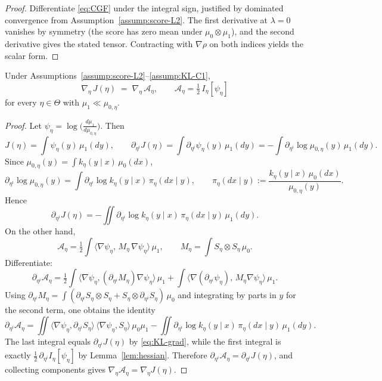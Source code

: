 \begin{proof}
Differentiate \eqref{eq:CGF} under the integral sign, justified by dominated convergence from Assumption~\ref{assump:score-L2}. The first derivative at $\lambda=0$ vanishes by symmetry (the score has zero mean under $\mu_0\otimes\mu_1$), and the second derivative gives the stated tensor. Contracting with $\nabla\rho$ on both indices yields the scalar form.
\end{proof}

\begin{theorem}
\label{thm:rose-equality}
Under Assumptions~\ref{assump:score-L2}--\ref{assump:KL-C1},
\[
    \boxed{
    \nabla_\eta\, J(\eta)
    \;=\;
    \nabla_\eta\, \mathcal A_\eta,
    \qquad
    \mathcal A_\eta = \tfrac12\, I_\eta[\psi_\eta]
    }
\]
for every $\eta\in\Theta$ with $\mu_1\ll\mu_{0,\eta}$.
\end{theorem}

\begin{proof}
Let $\psi_\eta=\log\big(\frac{d\mu_1}{d\mu_{0,\eta}}\big)$. Then
\[
    J(\eta)=\int \psi_\eta(y)\,\mu_1(dy),\qquad
    \partial_{\eta^i}J(\eta)=\int \partial_{\eta^i}\psi_\eta(y)\,\mu_1(dy)
    = -\int \partial_{\eta^i}\log \mu_{0,\eta}(y)\,\mu_1(dy).
\]
Since $\mu_{0,\eta}(y)=\int k_\eta(y\mid x)\,\mu_0(dx)$,
\[
    \partial_{\eta^i}\log \mu_{0,\eta}(y)
    = \int \partial_{\eta^i}\log k_\eta(y\mid x)\,
         \pi_\eta(dx\mid y),\qquad
    \pi_\eta(dx\mid y):=\frac{k_\eta(y\mid x)\,\mu_0(dx)}{\mu_{0,\eta}(y)}.
\]
Hence
\begin{equation}
\label{eq:KL-grad}
    \partial_{\eta^i}J(\eta)
    = -\iint \partial_{\eta^i}\log k_\eta(y\mid x)\,
                    \pi_\eta(dx\mid y)\,\mu_1(dy).
\end{equation}
On the other hand,
\[
    \mathcal A_\eta=\tfrac12\int \langle\nabla\psi_\eta,\,M_\eta\,\nabla\psi_\eta\rangle\,\mu_1,
    \qquad
    M_\eta=\int S_\eta\otimes S_\eta\,\mu_0.
\]
Differentiate:
\[
\partial_{\eta^i}\mathcal A_\eta
=\tfrac12\int \langle\nabla\psi_\eta,(\partial_{\eta^i}M_\eta)\nabla\psi_\eta\rangle\,\mu_1
  +\int \langle\nabla(\partial_{\eta^i}\psi_\eta),\,M_\eta\nabla\psi_\eta\rangle\,\mu_1.
\]
Using $\partial_{\eta^i}M_\eta=\int(\partial_{\eta^i}S_\eta\otimes S_\eta+S_\eta\otimes\partial_{\eta^i}S_\eta)\,\mu_0$ and integrating by parts in $y$ for the second term, one obtains the identity
\[
\partial_{\eta^i}\mathcal A_\eta
=\iint \langle\nabla\psi_\eta,\partial_{\eta^i}S_\eta\rangle\,\langle\nabla\psi_\eta,S_\eta\rangle\,\mu_0\mu_1
   -\iint \partial_{\eta^i}\log k_\eta(y\mid x)\,\pi_\eta(dx\mid y)\,\mu_1(dy).
\]
The last integral equals $\partial_{\eta^i}J(\eta)$ by \eqref{eq:KL-grad}, while the first integral is exactly $\tfrac12\,\partial_{\eta^i}I_\eta[\psi_\eta]$ by Lemma~\ref{lem:hessian}. Therefore $\partial_{\eta^i}\mathcal A_\eta=\partial_{\eta^i}J(\eta)$, and collecting components gives $\nabla_\eta \mathcal A_\eta=\nabla_\eta J(\eta)$.
\end{proof}


